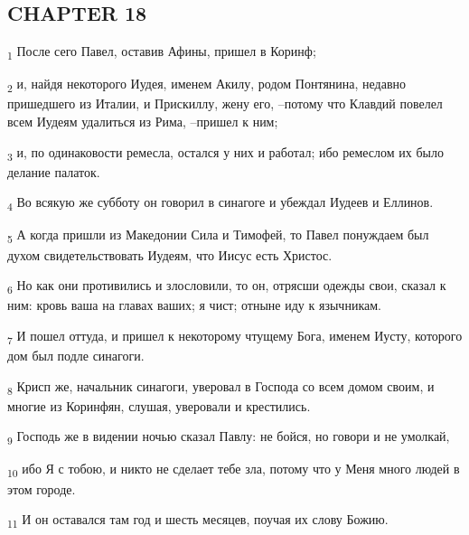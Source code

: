 \subsection{CHAPTER 18}
\begin{tcolorbox}
\textsubscript{1} После сего Павел, оставив Афины, пришел в Коринф;
\end{tcolorbox}
\begin{tcolorbox}
\textsubscript{2} и, найдя некоторого Иудея, именем Акилу, родом Понтянина, недавно пришедшего из Италии, и Прискиллу, жену его, --потому что Клавдий повелел всем Иудеям удалиться из Рима, --пришел к ним;
\end{tcolorbox}
\begin{tcolorbox}
\textsubscript{3} и, по одинаковости ремесла, остался у них и работал; ибо ремеслом их было делание палаток.
\end{tcolorbox}
\begin{tcolorbox}
\textsubscript{4} Во всякую же субботу он говорил в синагоге и убеждал Иудеев и Еллинов.
\end{tcolorbox}
\begin{tcolorbox}
\textsubscript{5} А когда пришли из Македонии Сила и Тимофей, то Павел понуждаем был духом свидетельствовать Иудеям, что Иисус есть Христос.
\end{tcolorbox}
\begin{tcolorbox}
\textsubscript{6} Но как они противились и злословили, то он, отрясши одежды свои, сказал к ним: кровь ваша на главах ваших; я чист; отныне иду к язычникам.
\end{tcolorbox}
\begin{tcolorbox}
\textsubscript{7} И пошел оттуда, и пришел к некоторому чтущему Бога, именем Иусту, которого дом был подле синагоги.
\end{tcolorbox}
\begin{tcolorbox}
\textsubscript{8} Крисп же, начальник синагоги, уверовал в Господа со всем домом своим, и многие из Коринфян, слушая, уверовали и крестились.
\end{tcolorbox}
\begin{tcolorbox}
\textsubscript{9} Господь же в видении ночью сказал Павлу: не бойся, но говори и не умолкай,
\end{tcolorbox}
\begin{tcolorbox}
\textsubscript{10} ибо Я с тобою, и никто не сделает тебе зла, потому что у Меня много людей в этом городе.
\end{tcolorbox}
\begin{tcolorbox}
\textsubscript{11} И он оставался там год и шесть месяцев, поучая их слову Божию.
\end{tcolorbox}
